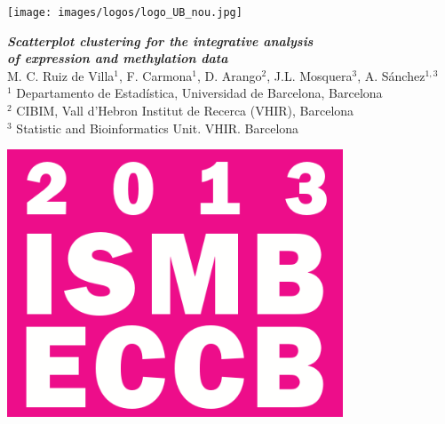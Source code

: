 
\colorbox{qmuldarkblue}{
 \color{white}
 
\begin{minipage}{0.2\textwidth}
\begin{center}
   \texttt{[image: images/logos/logo\_UB\_nou.jpg]}
   
   \end{center}
\end{minipage}


\begin{minipage}{0.6\textwidth}
\vspace*{0.4cm}
\begin{center}
   \textrm
   {
    {\huge \bf \em Scatterplot clustering for the integrative analysis
    \\ of expression and methylation data}\\[1ex]
    {\large M. C. Ruiz de Villa$^1$, F. Carmona$^1$, 
D. Arango$^2$, J.L. Mosquera$^3$, A. Sánchez$^{1,3}$}\\[1ex]
    {\large $^1$ Departamento de Estadística, Universidad de Barcelona,  Barcelona\\
    $^2$ CIBIM, Vall d'Hebron Institut de Recerca (VHIR), Barcelona\\
    $^3$ Statistic and Bioinformatics Unit. VHIR. Barcelona}
   }
   \end{center}
   
\vspace*{0.4cm}
\end{minipage}

\begin{minipage}{0.2\textwidth}
\begin{center}
   \includegraphics[width=10cm]{images/logos/logo_ISMB_ECCB_2013.png}
   \end{center}
\end{minipage}
}